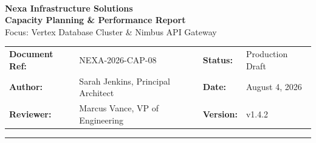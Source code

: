\documentclass[11pt,a4paper]{article}
\begin{document}
\begin{tcolorbox}[colback=primary!5!white, colframe=primary, arc=5mm, boxrule=1.5pt, left=20pt, right=20pt, top=20pt, bottom=20pt]
  \begin{center}
     \\[0.8em]
    {\Huge\bfseries\color{primary} Nexa Infrastructure Solutions} \\[0.4em]
    {\LARGE\bfseries\color{secondary} Capacity Planning \& Performance Report} \\[0.4em]
    {\large\color{darkgray} Focus: Vertex Database Cluster \& Nimbus API Gateway}
  \end{center}
\end{tcolorbox}

\vspace{1.5em}

\begin{tabularx}{\textwidth}{l X l X}
  \textbf{Document Ref:} & NEXA-2026-CAP-08 & \textbf{Status:} & Production Draft \\
  \textbf{Author:} & Sarah Jenkins, Principal Architect & \textbf{Date:} & August 4, 2026 \\
  \textbf{Reviewer:} & Marcus Vance, VP of Engineering & \textbf{Version:} & v1.4.2 \\
\end{tabularx}

\vspace{1.5em}
\hrule
\vspace{1.5em}

\begin{abstract}
This capacity planning and performance report evaluates the performance metrics and scaling requirements of the Vertex Database Cluster, a core database engine powering Nexa's SaaS platforms. Over the past six months, system workload has grown by 42\%, leading to elevated resource utilization during peak traffic windows. This document details the utilization trend analysis, results of automated load testing up to 10,000 requests per second (RPS), and database headroom projections. Finally, we propose a strategic scaling recommendation to migrate the current deployment to high-memory cluster instances, outlining cost projections, performance gains, and implementation risks.
\end{abstract}

\vspace{1.5em}
\tableofcontents
\newpage







\newpage
\nocite{*}


\end{document}
